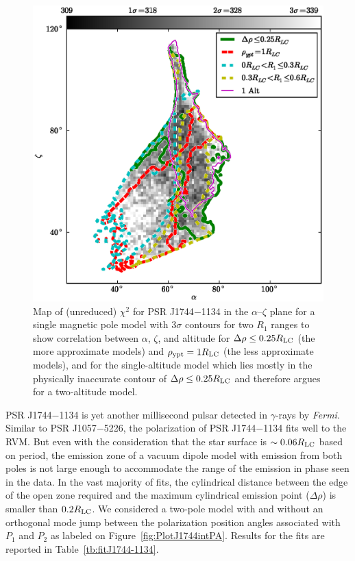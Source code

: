 \begin{figure}[t!!]
\begin{center}
\includegraphics[scale=.8]{chapters/applicationOfNumericalModel/figures/J1744-1134MapNoJumpSPtotRhoCut.eps}
\caption[Map of (unreduced) $\chi^{2}$ for PSR J1744$-$1134 in the $\alpha$--$\zeta$ plane]{\label{fig:J1744-1134MapNoJumpSP}
Map of (unreduced) $\chi^{2}$ for PSR J1744$-$1134 in the $\alpha$--$\zeta$ plane for a single magnetic pole model with $3\sigma$ 
contours for two $R_{1}$ ranges to show correlation between $\alpha$, $\zeta$, and altitude for
$\Delta\rho\leq 0.25R_{\rm{LC}}$ (the more approximate models) and $\rho_{\rm{ypt}}=1R_{\rm{LC}}$
(the less approximate models), and for the single-altitude model which lies mostly 
in the physically inaccurate contour of $\Delta\rho\leq 0.25R_{\rm{LC}}$ and therefore argues for a 
two-altitude model.
}
\end{center}
\end{figure}


PSR J1744$-$1134 is yet another millisecond pulsar detected in $\gamma$-rays 
by \textit{Fermi}.  Similar to PSR J1057$-$5226, 
the polarization of PSR J1744$-$1134 fits well to the RVM.  
But even with the consideration that the star surface is 
$\sim 0.06R_{\rm{LC}}$ based on period, the emission zone
of a vacuum dipole model with emission from both poles is not large enough to accommodate 
the range of the emission in phase seen in the data. 
In the vast majority of fits, the cylindrical distance between
the edge of the open zone required and the maximum cylindrical emission
point ($\Delta \rho$) is smaller than $0.2R_{\rm{LC}}$.  We considered a
two-pole model with and without an orthogonal mode jump between the polarization
position angles associated with $P_1$ and $P_2$ as labeled on Figure~\ref{fig:PlotJ1744intPA}.
Results for the fits are reported in Table~\ref{tb:fitJ1744-1134}.  

